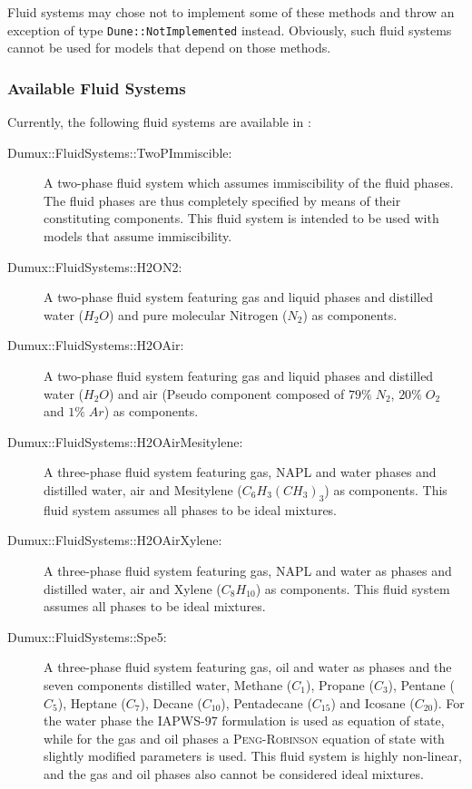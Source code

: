 Fluid systems may chose not to implement some of these methods and
throw an exception of type \lstinline{Dune::NotImplemented} instead. Obviously,
such fluid systems cannot be used for models that depend on those
methods.

\subsubsection{Available Fluid Systems}
Currently, the following fluid systems are available in \Dumux:
\begin{description}
\item[Dumux::FluidSystems::TwoPImmiscible:] A two-phase fluid system
  which assumes immiscibility of the fluid phases. The fluid phases
  are thus completely specified by means of their constituting
  components. This fluid system is intended to be used with models
  that assume immiscibility.
\item[Dumux::FluidSystems::H2ON2:] A two-phase fluid system featuring
  gas and liquid phases and distilled water ($H_2O$) and pure
  molecular Nitrogen ($N_2$) as components.
\item[Dumux::FluidSystems::H2OAir:] A two-phase fluid system
  featuring gas and liquid phases and distilled water ($H_2O$) and
  air (Pseudo component composed of $79\%\;N_2$, $20\%\;O_2$ and
  $1\%\;Ar$) as components.
\item[Dumux::FluidSystems::H2OAirMesitylene:] A three-phase fluid
  system featuring gas, NAPL and water phases and distilled water, air
  and Mesitylene ($C_6H_3(CH_3)_3$) as components. This fluid system
  assumes all phases to be ideal mixtures.
\item[Dumux::FluidSystems::H2OAirXylene:] A three-phase fluid system
  featuring gas, NAPL and water as phases and distilled water, air and
  Xylene ($C_8H_{10}$) as components. This fluid system assumes all
  phases to be ideal mixtures.
\item[Dumux::FluidSystems::Spe5:] A three-phase fluid system featuring
  gas, oil and water as phases and the seven components distilled
  water, Methane ($C_1$), Propane ($C_3$), Pentane ($C_5$), Heptane
  ($C_7$), Decane ($C_{10}$), Pentadecane ($C_{15}$) and Icosane
  ($C_{20}$). For the water phase the IAPWS-97 formulation is used as
  equation of state, while for the gas and oil phases a
  \textsc{Peng}-\textsc{Robinson} equation of state with slightly
  modified parameters is used. This fluid system is highly non-linear,
  and the gas and oil phases also cannot be considered ideal
  mixtures\cite{SPE5}.
\end{description}

